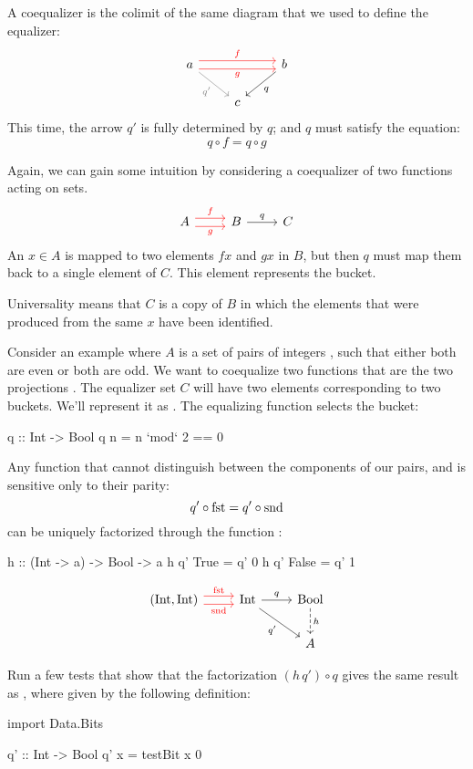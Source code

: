\documentclass[DaoFP]{subfiles}
\begin{document}
A coequalizer is the colimit of the same diagram that we used to define the equalizer:
\[
\begin{tikzcd}
a 
\arrow[rr, red, shift left=.75ex, "f"]
\arrow[rr, red, shift right=.75ex, "g"']
\arrow[rd, gray, "q'"']
&&
b
\arrow[ld, "q"]
\\
& c
\end{tikzcd}
\]
This time, the arrow $q'$ is fully determined by $q$; and $q$ must satisfy the equation:
\[ q \circ f = q \circ g \]

Again, we can gain some intuition by considering a coequalizer of two functions acting on sets. 
\[
\begin{tikzcd}
A
\arrow[r, red, shift left=.75ex, "f"]
\arrow[r, red, shift right=.75ex, "g"']
&
B
\arrow[r, "q"]
& C
\end{tikzcd}
\]
An $x \in A$ is mapped to two elements $f x$ and $g x$ in $B$, but then $q$ must map them back to a single element of $C$. This element represents the bucket. 

Universality means that $C$ is a copy of $B$ in which the elements that were produced from the same $x$ have been identified.

Consider an example where $A$ is a set of pairs of integers , such that either both are even or both are odd.  We want to coequalize two functions that are the two projections . The equalizer set $C$ will have two elements corresponding to two buckets. We'll represent it as . The equalizing function  selects the bucket:
\begin{haskell}
q :: Int -> Bool
q n = n `mod` 2 == 0 
\end{haskell}
Any function  that cannot distinguish between the components of our pairs, and is sensitive only to their parity:
\[ q' \circ \mathop{\text{fst}} = q' \circ \mathop{\text{snd}} \]
 can be uniquely factorized through the function :
\begin{haskell}
h :: (Int -> a) -> Bool -> a
h q' True  = q' 0
h q' False = q' 1
\end{haskell}

\[
\begin{tikzcd}
(\text{Int}, \text{Int})
\arrow[r, red, shift left=.75ex, "\text{fst}"]
\arrow[r, red, shift right=.75ex, "\text{snd}"']
&
\text{Int}
\arrow[r, "q"]
\arrow[rd, "q'"']
& \text{Bool}
\arrow[d, dashed, "h"]
\\
&& A
\end{tikzcd}
\]

\begin{exercise}
Run a few tests that show that the factorization $(h\, q') \circ q$ gives the same result as , where  given by the following definition:
\begin{haskell}
import Data.Bits

q' :: Int -> Bool
q' x = testBit x 0
\end{haskell}

\end{exercise}
\end{document}
